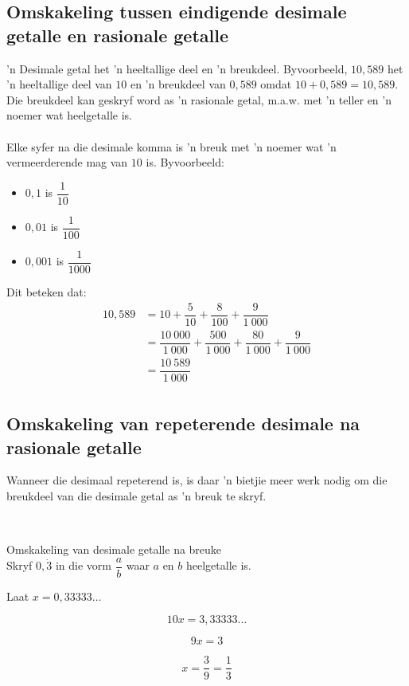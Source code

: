\subsection*{Omskakeling tussen eindigende desimale getalle en rasionale getalle}
’n Desimale getal het ’n heeltallige deel en ’n breukdeel. Byvoorbeeld, $10,589$ het ’n heeltallige deel van $10$ en ’n
breukdeel van $0,589$ omdat $10+0,589=10,589$. Die breukdeel kan geskryf word as ’n rasionale getal, m.a.w.
met ’n teller en ’n noemer wat heelgetalle is. \\
\\
Elke syfer na die desimale komma is ’n breuk met ’n noemer wat ’n vermeerderende mag van $10$ is. Byvoorbeeld: 
\begin{itemize}
 \item $0,1$ is $\dfrac{1}{10}$
\item $0,01$ is $\dfrac{1}{100}$
\item $0,001$ is $\dfrac{1}{1000}$
\end{itemize}

Dit beteken dat:
\begin{align*}
  10,589 &= 10 + \dfrac{5}{10} + \dfrac{8}{100} + \dfrac{9}{1~000} \\
  &= \dfrac{10~000}{1~000} + \dfrac{500}{1~000} + \dfrac{80}{1~000} + \dfrac{9}{1~000} \\
  &= \dfrac{10~589}{1~000} \\
\end{align*}

\subsection*{Omskakeling van repeterende desimale na rasionale getalle}


Wanneer die desimaal repeterend is, is daar ’n bietjie meer werk nodig om die breukdeel van die desimale getal
as ’n breuk te skryf.\par 
\
\begin{wex}
{%
Omskakeling van  desimale getalle na breuke
}
{%
\\
Skryf $0,\dot{3}$ in die vorm $\dfrac{a}{b}$ waar $a$ en $b$ heelgetalle is.
}
{%

Laat $x = 0,33333\ldots$



$$10x = 3,33333\ldots$$



$$9x = 3 $$


$$ x = \dfrac{3}{9} = \dfrac{1}{3} $$
}
\end{wex}

